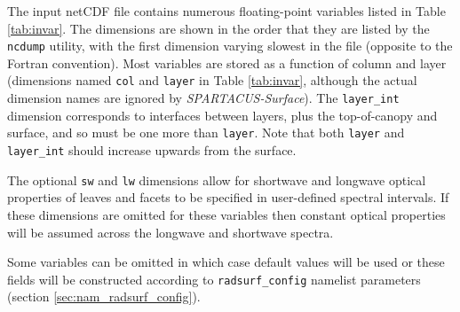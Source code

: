 \documentclass[a4,oneside]{article}
\def\codesize{\small}
\def\spsurf{\emph{SPARTACUS-Surface}}
\def\code#1{{\codesize\texttt{#1}}}
\begin{document}
The input netCDF file contains numerous floating-point variables
listed in Table \ref{tab:invar}. The dimensions are shown in the order
that they are listed by the \code{ncdump} utility, with the first
dimension varying slowest in the file (opposite to the Fortran
convention).  Most variables are stored as a function of column and
layer (dimensions named \code{col} and \code{layer} in Table
\ref{tab:invar}, although the actual dimension names are ignored by
\spsurf). The \code{layer\_int} dimension corresponds to interfaces
between layers, plus the top-of-canopy and surface, and so must be one
more than \code{layer}. Note that both \code{layer} and
\code{layer\_int} should increase upwards from the surface.

The optional \code{sw} and \code{lw} dimensions allow for shortwave
and longwave optical properties of leaves and facets to be specified
in user-defined spectral intervals. If these dimensions are omitted
for these variables then constant optical properties will be assumed
across the longwave and shortwave spectra.

Some variables can be omitted in which case default values will be
used or these fields will be constructed according to
\code{radsurf\_config} namelist parameters (section
\ref{sec:nam_radsurf_config}).
\end{document}
